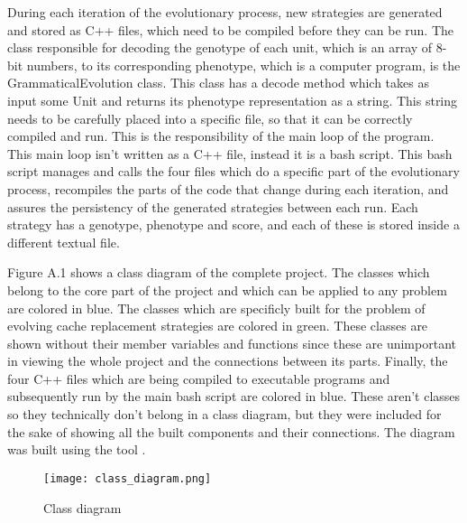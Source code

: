 During each iteration of the evolutionary process, new strategies are generated and stored as C++ files, which need to be compiled before they can be run. The class responsible for decoding the genotype of each unit, which is an array of 8-bit numbers, to its corresponding phenotype, which is a computer program, is the GrammaticalEvolution class. This class has a decode method which takes as input some Unit and returns its phenotype representation as a string. This string needs to be carefully placed into a specific file, so that it can be correctly compiled and run. This is the responsibility of the main loop of the program. This main loop isn't written as a C++ file, instead it is a bash script. This bash script manages and calls the four files which do a specific part of the evolutionary process, recompiles the parts of the code that change during each iteration, and assures the persistency of the generated strategies between each run. Each strategy has a genotype, phenotype and score, and each of these is stored inside a different textual file.

Figure A.1 shows a class diagram of the complete project. The classes which belong to the core part of the project and which can be applied to any problem are colored in blue. The classes which are specificly built for the problem of evolving cache replacement strategies are colored in green. These classes are shown without their member variables and functions since these are unimportant in viewing the whole project and the connections between its parts. Finally, the four C++ files which are being compiled to executable programs and subsequently run by the main bash script are colored in blue. These aren't classes so they technically don't belong in a class diagram, but they were included for the sake of showing all the built components and their connections. The diagram was built using the tool \citep{diagrams}.

\begin{figure}[H]
	\centering
	\texttt{[image: class\_diagram.png]}
	\caption{Class diagram}
\end{figure}